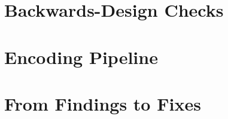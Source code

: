 \documentclass[sigconf,review]{acmart}
\begin{document}

\section{Backwards-Design Checks}
\label{sec:checks}


\section{Encoding Pipeline}
\label{sec:pipeline}


\section{From Findings to Fixes}
\label{sec:recommend}
\end{document}

